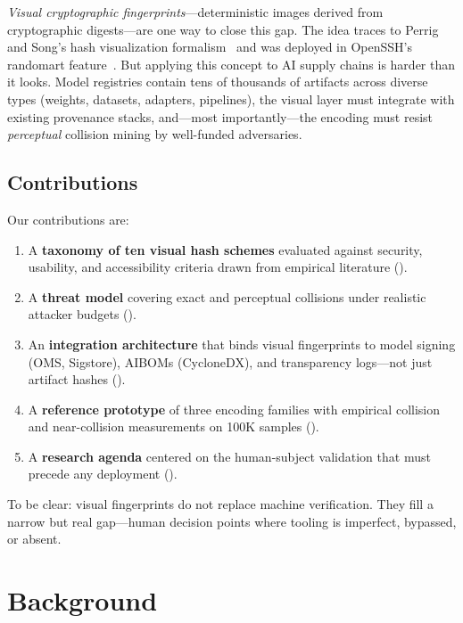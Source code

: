 \documentclass[conference,10pt]{IEEEtran}
\begin{document}
\emph{Visual cryptographic fingerprints}---deterministic images derived from cryptographic digests---are one way to close this gap.
The idea traces to Perrig and Song's hash visualization formalism~\cite{perrig1999hash} and was deployed in OpenSSH's randomart feature~\cite{openssh2008release}.
But applying this concept to AI supply chains is harder than it looks.
Model registries contain tens of thousands of artifacts across diverse types (weights, datasets, adapters, pipelines), the visual layer must integrate with existing provenance stacks, and---most importantly---the encoding must resist \emph{perceptual} collision mining by well-funded adversaries.

\subsection{Contributions}

Our contributions are:

\begin{enumerate}[leftmargin=*,nosep]
  \item A \textbf{taxonomy of ten visual hash schemes} evaluated against security, usability, and accessibility criteria drawn from empirical literature ().
  \item A \textbf{threat model} covering exact and perceptual collisions under realistic attacker budgets ().
  \item An \textbf{integration architecture} that binds visual fingerprints to model signing (OMS, Sigstore), AIBOMs (CycloneDX), and transparency logs---not just artifact hashes ().
  \item A \textbf{reference prototype} of three encoding families with empirical collision and near-collision measurements on 100K samples ().
  \item A \textbf{research agenda} centered on the human-subject validation that must precede any deployment ().
\end{enumerate}

To be clear: visual fingerprints do not replace machine verification. They fill a narrow but real gap---human decision points where tooling is imperfect, bypassed, or absent.

\section{Background}
\label{sec:background}
\end{document}
